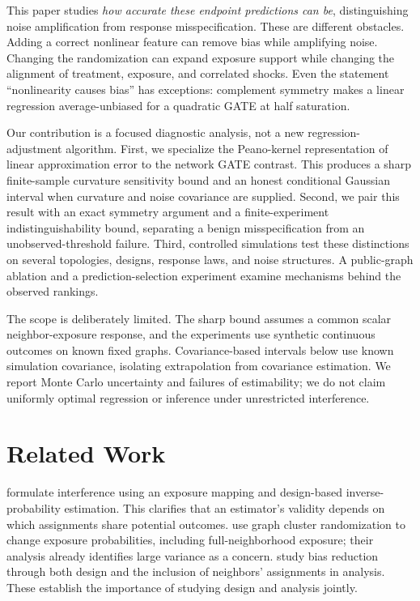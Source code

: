 \documentclass{article}
\begin{document}
This paper studies \emph{how accurate these endpoint predictions can be}, distinguishing noise amplification from response misspecification. These are different obstacles. Adding a correct nonlinear feature can remove bias while amplifying noise. Changing the randomization can expand exposure support while changing the alignment of treatment, exposure, and correlated shocks. Even the statement ``nonlinearity causes bias'' has exceptions: complement symmetry makes a linear regression average-unbiased for a quadratic GATE at half saturation.

Our contribution is a focused diagnostic analysis, not a new regression-adjustment algorithm. First, we specialize the Peano-kernel representation of linear approximation error to the network GATE contrast. This produces a sharp finite-sample curvature sensitivity bound and an honest conditional Gaussian interval when curvature and noise covariance are supplied. Second, we pair this result with an exact symmetry argument and a finite-experiment indistinguishability bound, separating a benign misspecification from an unobserved-threshold failure. Third, controlled simulations test these distinctions on several topologies, designs, response laws, and noise structures. A public-graph ablation and a prediction-selection experiment examine mechanisms behind the observed rankings.

The scope is deliberately limited. The sharp bound assumes a common scalar neighbor-exposure response, and the experiments use synthetic continuous outcomes on known fixed graphs. Covariance-based intervals below use known simulation covariance, isolating extrapolation from covariance estimation. We report Monte Carlo uncertainty and failures of estimability; we do not claim uniformly optimal regression or inference under unrestricted interference.

\section{Related Work}
\citet{aronow2017} formulate interference using an exposure mapping and design-based inverse-probability estimation. This clarifies that an estimator's validity depends on which assignments share potential outcomes. \citet{ugander2013} use graph cluster randomization to change exposure probabilities, including full-neighborhood exposure; their analysis already identifies large variance as a concern. \citet{eckles2017} study bias reduction through both design and the inclusion of neighbors' assignments in analysis. These establish the importance of studying design and analysis jointly.
\end{document}
